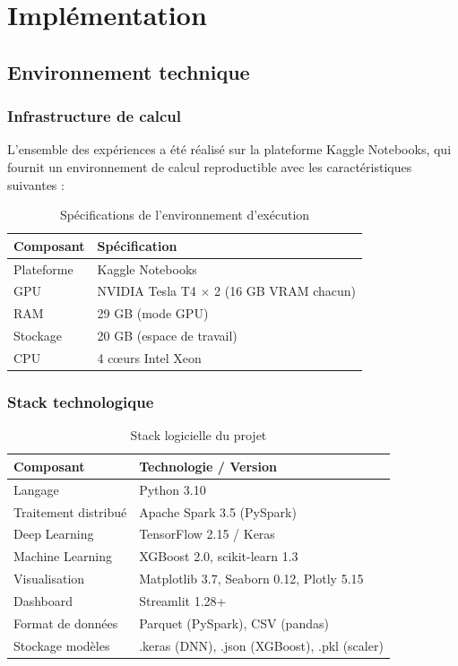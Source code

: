 \chapter{Implémentation}

\section{Environnement technique}

\subsection{Infrastructure de calcul}

L'ensemble des expériences a été réalisé sur la plateforme Kaggle Notebooks, qui fournit un environnement de calcul reproductible avec les caractéristiques suivantes :

\begin{table}[H]
\centering
\caption{Spécifications de l'environnement d'exécution}
\label{tab:env}
\begin{tabular}{ll}
\toprule
\textbf{Composant} & \textbf{Spécification} \\
\midrule
Plateforme        & Kaggle Notebooks \\
GPU               & NVIDIA Tesla T4 $\times$ 2 (16 GB VRAM chacun) \\
RAM               & 29 GB (mode GPU) \\
Stockage          & 20 GB (espace de travail) \\
CPU               & 4 cœurs Intel Xeon \\
\bottomrule
\end{tabular}
\end{table}

\subsection{Stack technologique}

\begin{table}[H]
\centering
\caption{Stack logicielle du projet}
\label{tab:stack}
\begin{tabular}{ll}
\toprule
\textbf{Composant} & \textbf{Technologie / Version} \\
\midrule
Langage              & Python 3.10 \\
Traitement distribué & Apache Spark 3.5 (PySpark) \\
Deep Learning        & TensorFlow 2.15 / Keras \\
Machine Learning     & XGBoost 2.0, scikit-learn 1.3 \\
Visualisation        & Matplotlib 3.7, Seaborn 0.12, Plotly 5.15 \\
Dashboard            & Streamlit 1.28+ \\
Format de données    & Parquet (PySpark), CSV (pandas) \\
Stockage modèles     & .keras (DNN), .json (XGBoost), .pkl (scaler) \\
\bottomrule
\end{tabular}
\end{table}

